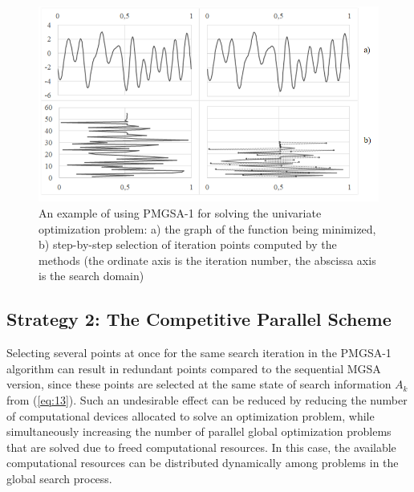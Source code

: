 \documentclass[review]{elsarticle}
\begin{document}
\begin{figure}
  \centering
  \includegraphics[width=\linewidth]{fig2}
  \caption{An example of using PMGSA-1 for solving the univariate optimization problem: a) the graph of the function being minimized, b) step-by-step selection of iteration points computed by the methods (the ordinate axis is the iteration number, the abscissa axis is the search domain)}
  \label{fig:2}
\end{figure}

\subsection{Strategy 2: The Competitive Parallel Scheme} \label{subsec:2}

Selecting several points at once for the same search iteration in the PMGSA-1 algorithm can result in redundant points compared to the sequential MGSA version, since these points are selected at the same state of search information $A_k$ from (\ref{eq:13}). Such an undesirable effect can be reduced by reducing the number of computational devices allocated to solve an optimization problem, while simultaneously increasing the number of parallel global optimization problems that are solved due to freed computational resources. In this case, the available computational resources can be distributed dynamically among problems in the global search process.
\end{document}
